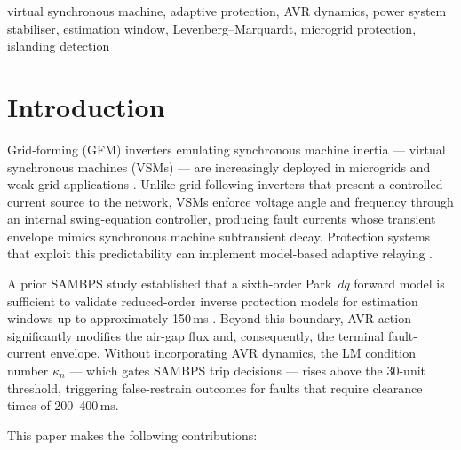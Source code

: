 \documentclass[journal]{IEEEtran}
\newcommand{\kappan}{\kappa_{n}}
\begin{document}
\begin{IEEEkeywords}
virtual synchronous machine, adaptive protection, AVR dynamics,
power system stabiliser, estimation window, Levenberg--Marquardt,
microgrid protection, islanding detection
\end{IEEEkeywords}

\section{Introduction}
\label{sec:intro}

Grid-forming (GFM) inverters emulating synchronous machine inertia ---
virtual synchronous machines (VSMs) --- are increasingly deployed in
microgrids and weak-grid applications \cite{Zhong2011VSM,Driesen2008VSM}.
Unlike grid-following inverters that present a controlled current source
to the network, VSMs enforce voltage angle and frequency through an
internal swing-equation controller, producing fault currents whose
transient envelope mimics synchronous machine subtransient decay.
Protection systems that exploit this predictability can implement
model-based adaptive relaying \cite{Hooshyar2019}.

A prior SAMBPS study established that a sixth-order Park~$dq$ forward
model is sufficient to validate reduced-order inverse protection models
for estimation windows up to approximately 150\,ms
\cite{Eluvathingal2025_6th}.  Beyond this boundary, AVR action
significantly modifies the air-gap flux and, consequently, the
terminal fault-current envelope.  Without incorporating AVR dynamics,
the LM condition number $\kappan$ --- which gates SAMBPS trip decisions
--- rises above the 30-unit threshold, triggering false-restrain
outcomes for faults that require clearance times of 200--400\,ms.

This paper makes the following contributions:
\end{document}
